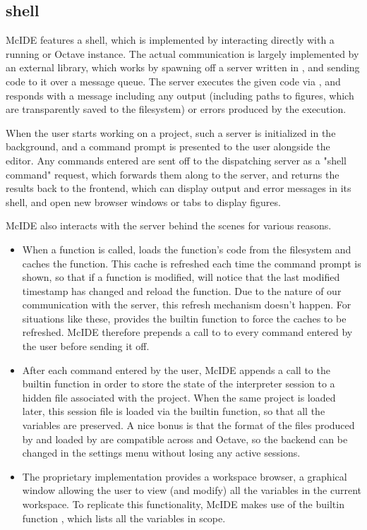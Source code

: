 \subsection{\matlab shell}

McIDE features a \matlab shell, which is implemented by interacting directly
with a running \matlab or Octave instance. The actual communication is largely
implemented by an external library, which works by spawning off a server
written in \matlab, and sending code to it over a message queue. The server
executes the given code via , and responds with a message including
any output (including paths to figures, which are transparently saved to the
filesystem) or errors produced by the execution.

When the user starts working on a project, such a \matlab server is initialized
in the background, and a command prompt is presented to the user alongside the
editor. Any commands entered are sent off to the dispatching server as a "shell
command" request, which forwards them along to the \matlab server, and returns
the results back to the frontend, which can display output and error messages
in its shell, and open new browser windows or tabs to display figures.

McIDE also interacts with the \matlab server behind the scenes for various
reasons.

\begin{itemize}

\item When a function is called, \matlab loads the function's code from the
filesystem and caches the function. This cache is refreshed each time the
command prompt is shown, so that if a function is modified, \matlab will notice
that the last modified timestamp has changed and reload the function. Due to
the nature of our communication with the \matlab server, this refresh mechanism
doesn't happen. For situations like these, \matlab provides the 
builtin function to force the caches to be refreshed. McIDE therefore prepends
a call to  to every command entered by the user before sending it
off.

\item After each command entered by the user, McIDE appends a call to the
 \matlab builtin function in order to store the state of the
interpreter session to a hidden file associated with the project. When the same
project is loaded later, this session file is loaded via the builtin
 function, so that all the variables are preserved. A nice bonus is
that the format of the files produced by  and loaded by 
are compatible across \matlab and Octave, so the backend can be changed in the
settings menu without losing any active sessions.

\item The proprietary \matlab implementation provides a workspace browser, a
graphical window allowing the user to view (and modify) all the variables in
the current workspace. To replicate this functionality, McIDE makes use of the
\matlab builtin function , which lists all the variables in scope.

\end{itemize}

